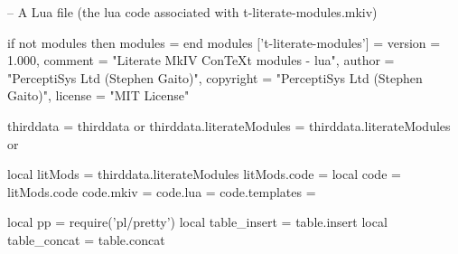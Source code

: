 
\usemodule[t-contests]

\unprotect


\stopMkIVCode

\startLuaCode

-- A Lua file (the lua code associated with t-literate-modules.mkiv)

if not modules then modules = { } end modules ['t-literate-modules'] = {
    version   = 1.000,
    comment   = "Literate MkIV ConTeXt modules - lua",
    author    = "PerceptiSys Ltd (Stephen Gaito)",
    copyright = "PerceptiSys Ltd (Stephen Gaito)",
    license   = "MIT License"
}

thirddata                 = thirddata                 or {}
thirddata.literateModules = thirddata.literateModules or {}

local litMods  = thirddata.literateModules
litMods.code   = {}
local code     = litMods.code
code.mkiv      = {}
code.lua       = {}
code.templates = {}

local pp = require('pl/pretty')
local table_insert = table.insert
local table_concat = table.concat

\stopLuaCode

\stopchapter